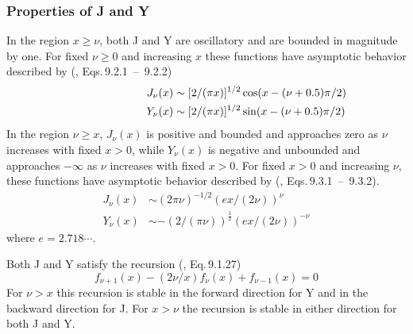 \documentclass[twoside]{MATH77}
\begin{document}
\subsubsection{Properties of J and Y}

In the region $x \geq \nu $, both J and Y are oscillatory and are bounded in
magnitude by one. For fixed $\nu \geq 0$ and increasing $x$ these functions
have asymptotic behavior described by (\cite{ams55:bes}, Eqs.\,9.2.1~--~9.2.2)
\begin{align}
\label{O1}J_\nu (x) &\sim [2/(\pi x)]^{1/2} \cos (x-(\nu + 0.5)\pi /2)
\hspace{-1in}\\
\label{O2}Y_\nu (x) &\sim [2/(\pi x)]^{1/2} \sin (x - (\nu + 0.5)\pi /2)
\hspace{-1in}
\end{align}
In the region $\nu \geq x$, $J_\nu (x)$ is positive and bounded and
approaches zero as $\nu $ increases with fixed $x > 0$, while $Y_\nu (x)$ is
negative and unbounded and approaches $-\infty $ as $\nu $ increases with
fixed $x > 0$. For fixed $x > 0$ and increasing $\nu $, these functions have
asymptotic behavior described by (\cite{ams55:bes}, Eqs.\,9.3.1~--~9.3.2).
\begin{align}
\label{O3}J_\nu (x) &\sim (2\pi \nu )^{-1/2}(ex/(2\nu ))^\nu\\
\label{O4}Y_\nu (x) &\sim -(2/(\pi \nu ))^{\frac{1}{2}}(ex/(2\nu))^{-\nu}
\end{align}
where $e = 2.718\cdots .$

Both J and Y satisfy the recursion (\cite{ams55:bes}, Eq.\,9.1.27)
\begin{equation}
\label{O5}f_{\nu +1}(x) - (2\nu /x) f_\nu (x) + f_{\nu - 1}(x) = 0
\end{equation}
For $\nu > x$ this recursion is stable in the forward direction for Y and in
the backward direction for J. For $x > \nu $ the recursion is stable in
either direction for both J and Y.



%
\end{document}
